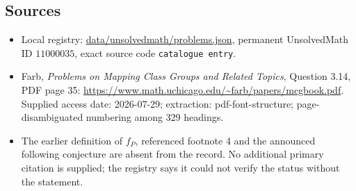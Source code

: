 \documentclass[11pt]{article}
\begin{document}
\subsection{Sources}
\begin{itemize}
\item Local registry: \url{data/unsolvedmath/problems.json}, permanent UnsolvedMath ID $11000035$, exact source code \texttt{catalogue entry}.
\item Farb, \emph{Problems on Mapping Class Groups and Related Topics}, Question 3.14, PDF page 35: \url{https://www.math.uchicago.edu/~farb/papers/mcgbook.pdf}. Supplied access date: 2026-07-29; extraction: pdf-font-structure; page-disambiguated numbering among 329 headings.
\item The earlier definition of $f_P$, referenced footnote 4 and the announced following conjecture are absent from the record. No additional primary citation is supplied; the registry says it could not verify the status without the statement.
\end{itemize}
\end{document}
